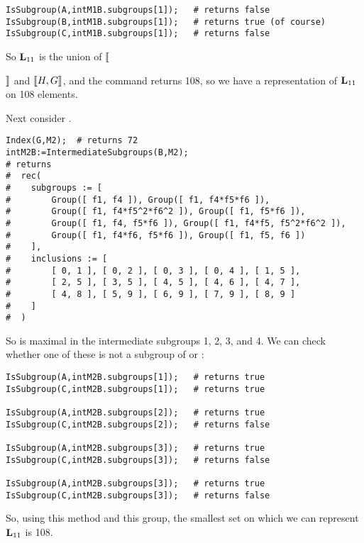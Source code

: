 {\small 
\begin{verbatim}
IsSubgroup(A,intM1B.subgroups[1]);   # returns false
IsSubgroup(B,intM1B.subgroups[1]);   # returns true (of course)
IsSubgroup(C,intM1B.subgroups[1]);   # returns false
\end{verbatim}
}
So $\mathbf{L}_{11}$ is the union of $\llbracket${$\rrbracket$
and $\llbracket H, G \rrbracket$, and the command  returns 108,
so we have a representation of $\mathbf{L}_{11}$ on 108 elements.

Next consider .

{\small 
\begin{verbatim}
Index(G,M2);  # returns 72
intM2B:=IntermediateSubgroups(B,M2);
# returns 
#  rec( 
#    subgroups := [ 
#        Group([ f1, f4 ]), Group([ f1, f4*f5*f6 ]), 
#        Group([ f1, f4*f5^2*f6^2 ]), Group([ f1, f5*f6 ]), 
#        Group([ f1, f4, f5*f6 ]), Group([ f1, f4*f5, f5^2*f6^2 ]), 
#        Group([ f1, f4*f6, f5*f6 ]), Group([ f1, f5, f6 ]) 
#    ], 
#    inclusions := [ 
#        [ 0, 1 ], [ 0, 2 ], [ 0, 3 ], [ 0, 4 ], [ 1, 5 ], 
#        [ 2, 5 ], [ 3, 5 ], [ 4, 5 ], [ 4, 6 ], [ 4, 7 ], 
#        [ 4, 8 ], [ 5, 9 ], [ 6, 9 ], [ 7, 9 ], [ 8, 9 ] 
#    ] 
#  )
\end{verbatim}
}
So  is maximal in the intermediate subgroups 1, 2, 3, and 4.
We can check whether one of these is not a subgroup of  or :

{\small 
\begin{verbatim}
IsSubgroup(A,intM2B.subgroups[1]);   # returns true
IsSubgroup(C,intM2B.subgroups[1]);   # returns true

IsSubgroup(A,intM2B.subgroups[2]);   # returns true
IsSubgroup(C,intM2B.subgroups[2]);   # returns false

IsSubgroup(A,intM2B.subgroups[3]);   # returns true
IsSubgroup(C,intM2B.subgroups[3]);   # returns false

IsSubgroup(A,intM2B.subgroups[3]);   # returns true
IsSubgroup(C,intM2B.subgroups[3]);   # returns false
\end{verbatim}
}
So, using this method and this group, the smallest set on 
which we can represent $\mathbf{L}_{11}$ is 108.



}
